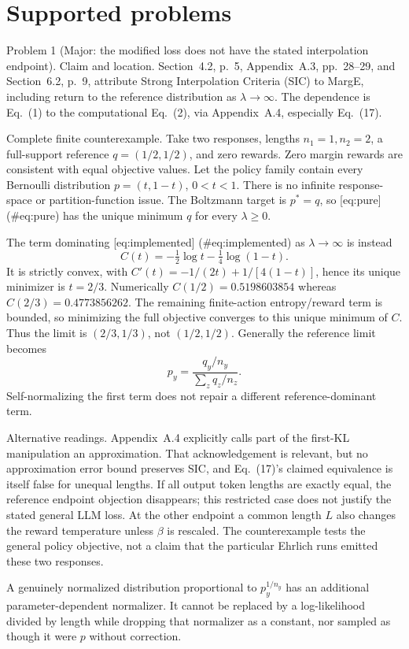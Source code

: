 \documentclass[10pt]{article}
\begin{document}
\section*{Supported problems}
Problem 1 (Major: the modified loss does not have the stated interpolation endpoint).  Claim and location. Section 4.2, p. 5, Appendix A.3, pp. 28–29, and Section 6.2, p. 9, attribute Strong Interpolation Criteria (SIC) to MargE, including return to the reference distribution as \(\lambda\to\infty\). The dependence is Eq. (1) to the computational Eq. (2), via Appendix A.4, especially Eq. (17).\par
Complete finite counterexample. Take two responses, lengths \(n_1=1,n_2=2\), a full-support reference \(q=(1/2,1/2)\), and zero rewards. Zero margin rewards are consistent with equal objective values. Let the policy family contain every Bernoulli distribution \(p=(t,1-t)\), \(0<t<1\). There is no infinite response-space or partition-function issue. The Boltzmann target is \(p^*=q\), so [eq:pure] (\#eq:pure) has the unique minimum \(q\) for every \(\lambda\geq0\).\par
The term dominating [eq:implemented] (\#eq:implemented) as \(\lambda\to\infty\) is instead \[C(t)=-\tfrac12\log t-\tfrac14\log(1-t).\] It is strictly convex, with \(C'(t)=-1/(2t)+1/[4(1-t)]\), hence its unique minimizer is \(t=2/3\). Numerically \(C(1/2)=0.5198603854\) whereas \(C(2/3)=0.4773856262\). The remaining finite-action entropy/reward term is bounded, so minimizing the full objective converges to this unique minimum of \(C\). Thus the limit is \((2/3,1/3)\), not \((1/2,1/2)\). Generally the reference limit becomes \[p_y=\frac{q_y/n_y}{\sum_z q_z/n_z}.\] Self-normalizing the first term does not repair a different reference-dominant term.\par
Alternative readings. Appendix A.4 explicitly calls part of the first-KL manipulation an approximation. That acknowledgement is relevant, but no approximation error bound preserves SIC, and Eq. (17)’s claimed equivalence is itself false for unequal lengths. If all output token lengths are exactly equal, the reference endpoint objection disappears; this restricted case does not justify the stated general LLM loss. At the other endpoint a common length \(L\) also changes the reward temperature unless \(\beta\) is rescaled. The counterexample tests the general policy objective, not a claim that the particular Ehrlich runs emitted these two responses.\par
A genuinely normalized distribution proportional to \(p_y^{1/n_y}\) has an additional parameter-dependent normalizer. It cannot be replaced by a log-likelihood divided by length while dropping that normalizer as a constant, nor sampled as though it were \(p\) without correction.\par
\end{document}
